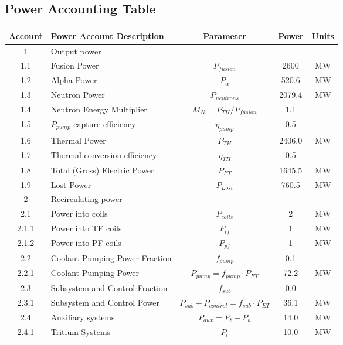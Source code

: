 \newpage
\subsection{Power Accounting Table}

\begin{table}[ht!]								
\centering								
\begin{tabular}{|c|p{5cm}|c|c|c|}								
\hline								
\textbf{Account}	&	\textbf{Power Account Description}	&	\textbf{Parameter }	&	\textbf{Power}	&	\textbf{Units} \\
\hline								
1	&	Output power	&		&		&	\\
\hline
1.1	&	Fusion Power	&	$P_{{fusion}}$	&	2600	&	MW \\
1.2	&	Alpha Power	&	$P_{{\alpha}}$	&	520.6	&	MW \\
1.3	&	Neutron Power	&	$P_{{neutrons}}$	&	2079.4	&	MW \\
1.4	&	Neutron Energy Multiplier	&	$M_N = P_{{TH}}/P_{{fusion}}$	&	1.1	&	\\
1.5	&	$P_{pump}$ capture efficiency	&	$\eta_{{pump}}$	&	0.5	&	\\
1.6	&	Thermal Power	&	$P_{{TH}}$	&	2406.0	&	MW \\
1.7	&	Thermal conversion efficiency	&	$\eta_{{TH}}$	&	0.5	&	\\
1.8	&	Total (Gross) Electric Power	&	$P_{{ET}}$	&	1645.5	&	MW \\
1.9	&	Lost Power	&	$P_{{Lost}}$	&	760.5	&	MW \\
\hline								
2	&	Recirculating power	&		&		&	\\
\hline
2.1	&	Power into coils 	&	$P_{coils}$ &	2	&	MW \\
2.1.1	&	Power into TF coils	&	$P_{tf}$	&	1	&	MW \\
2.1.2	&	Power into PF coils	&	$P_{pf}$	&	1		&	MW \\
2.2	&	Coolant Pumping Power Fraction	&	$f_{{pump}}$	&	0.1 &	\\
2.2.1	&	Coolant Pumping Power	&	$P_{{pump}} = f_{{pump}} \cdot P_{{ET}}$	&	72.2	&	MW \\
2.3	&	Subsystem and Control Fraction	&	$f_{{sub}}$	&	0.0	&	\\
2.3.1	&	Subsystem and Control Power	&	$P_{{sub}} + P_{{control}} = f_{{sub}} \cdot P_{{ET}}$	&	36.1	&	MW \\
2.4	&	Auxiliary systems	&	$P_{{aux}} = P_{{t}} + P_{{h}}$	&	14.0	&	MW \\
2.4.1	&	Tritium Systems	&	$P_{{t}}$	&	10.0	&	MW \\

\end{tabular}
\end{table}

